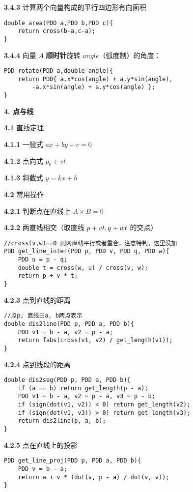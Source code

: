 \documentclass[12pt]{article}
\begin{document}
\textbf{3.4.3} 计算两个向量构成的平行四边形有向面积

\begin{lstlisting}[style=C++]
double area(PDD a,PDD b,PDD c){
	return cross(b-a,c-a);
}
\end{lstlisting}

\textbf{3.4.4} 向量 $A$ \textbf{顺时针}旋转 $angle$（弧度制）的角度：

\begin{lstlisting}[style=C++]
PDD rotate(PDD a,double angle){
	return PDD{ a.x*cos(angle) + a.y*sin(angle),
		-a.x*sin(angle) + a.y*cos(angle) };
}
\end{lstlisting}

\textbf{4. 点与线}

\textbf{4.1} 直线定理

\textbf{4.1.1} 一般式 $ax+by+c=0$

\textbf{4.1.2} 点向式 $p_0+vt$

\textbf{4.1.3} 斜截式 $y=kx+b$

\textbf{4.2} 常用操作

\textbf{4.2.1} 判断点在直线上 $A\times B=0$

\textbf{4.2.2} 两直线相交（取直线 $p+vt,\space q+wt$ 的交点）

\begin{lstlisting}[style=C++]
//cross(v,w)==0 则两直线平行或者重合，注意特判，这里没加
PDD get_line_inter(PDD p, PDD v, PDD q, PDD w){
	PDD u = p - q;
	double t = cross(w, u) / cross(v, w);
	return p + v * t;
}
\end{lstlisting}

\textbf{4.2.3} 点到直线的距离

\begin{lstlisting}[style=C++]
//点p; 直线由a, b两点表示
double dis2line(PDD p, PDD a, PDD b){
	PDD v1 = b - a, v2 = p - a;
	return fabs(cross(v1, v2) / get_length(v1));
}
\end{lstlisting}

\textbf{4.2.4} 点到线段的距离

\begin{lstlisting}[style=C++]
double dis2seg(PDD p, PDD a, PDD b){
	if (a == b) return get_length(p - a);
	PDD v1 = b - a, v2 = p - a, v3 = p - b;
	if (sign(dot(v1, v2)) < 0) return get_length(v2);
	if (sign(dot(v1, v3)) > 0) return get_length(v3);
	return dis2line(p, a, b);
}
\end{lstlisting}

\textbf{4.2.5} 点在直线上的投影

\begin{lstlisting}[style=C++]
PDD get_line_proj(PDD p, PDD a, PDD b){
	PDD v = b - a;
	return a + v * (dot(v, p - a) / dot(v, v));
}
\end{lstlisting}
\end{document}
